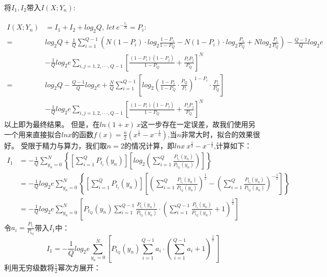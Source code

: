 \documentclass[12pt]{article}
\begin{document}
将$I_1,I_2$带入$I(X;Y_n)$:\par
\begin{equation*}
  \begin{aligned}
    I(X;Y_n) &= I_1+I_2+log_2Q,\ let\ e^{-\frac{t_i}{N}}=P_i :\\
    =& log_2Q+\frac{1}{Q}\sum\limits_{i=1}^{Q-1}\left(N(1-P_i)·log_2\frac{1-P_1}{1-P_Q}-N(1-P_i)·log_2\frac{P_1}{P_Q}+Nlog_2\frac{P_i}{P_Q}\right)-\frac{Q-1}{Q}log_2e \\
    &- \frac{1}{Q}log_2e\sum\limits_{i,j=1,2,···,Q-1}\left[\frac{(1-P_i)(1-P_j)}{1-P_Q}+\frac{P_iP_j}{P_Q}\right]^N \\
    =& log_2Q-\frac{Q-1}{Q}log_2e+\frac{N}{Q}\sum\limits_{i=1}^{Q-1}\left[log_2\left(\frac{1-P_i}{1-P_Q}·\frac{P_Q}{P_i}\right)^{1-P_i}·\frac{P_i}{P_Q}\right]\\
    &- \frac{1}{Q}log_2e\sum\limits_{i,j=1,2,···,Q-1}\left[\frac{(1-P_i)(1-P_j)}{1-P_Q}+\frac{P_iP_j}{P_Q}\right]^N
  \end{aligned}
\end{equation*}
以上即为最终结果。
但是，在$ln(1+x)~x$这一步存在一定误差，故我们使用另一个用来直接拟合$lnx$的函数$f(x)=\frac{n}{2}\left(x^{\frac{1}{n}}-x^{-\frac{1}{n}}\right)$,当$n$非常大时，拟合的效果很好。
受限于精力与算力，我们取$n=2$的情况计算，即$lnx~x^{\frac{1}{2}}-x^{-\frac{1}{2}}$,计算如下：
\begin{equation*}
  \begin{aligned}
    I_1 &= -\frac{1}{Q}\sum\limits_{y_n=0}^{N}\left\{\left[\sum\limits_{i=1}^QP_{t_i}(y_n)\right]\left[log_2\left(\sum\limits_{i=1}^Q\frac{P_{t_i}(y_n)}{P_{t_Q}(y_n)}\right)\right]\right\} \\
    &= -\frac{1}{Q}log_2e\sum\limits_{y_n=0}^{N}\left\{\left[\sum\limits_{i=1}^QP_{t_i}(y_n)\right]\left[\left(\sum\limits_{i=1}^Q\frac{P_{t_i}(y_n)}{P_{t_Q}(y_n)}\right)^{\frac{1}{2}}-\left(\sum\limits_{i=1}^Q\frac{P_{t_i}(y_n)}{P_{t_Q}(y_n)}\right)^{-\frac{1}{2}}\right]\right\} \\
    &= -\frac{1}{Q}log_2e\sum\limits_{y_n=0}^{N}\left[P_{t_Q}(y_n)\sum\limits_{i=1}^{Q-1}\frac{P_{t_i}(y_n)}{P_{t_Q}(y_n)}·\left(\sum\limits_{i=1}^{Q-1}\frac{P_{t_i}(y_n)}{P_{t_Q}(y_n)}+1\right)^{\frac{1}{2}}\right]
  \end{aligned}
\end{equation*}
令$a_i=\frac{P_{t_i}}{P_{t_Q}}$带入$I_1$中：
$$I_1=-\frac{1}{Q}log_2e\sum\limits_{y_n=0}^{N}\left[P_{t_Q}(y_n)\sum\limits_{i=1}^{Q-1}a_i·\left(\sum\limits_{i=1}^{Q-1}a_i+1\right)^{\frac{1}{2}}\right]$$
利用无穷级数将$\frac{1}{2}$幂次方展开：
\end{document}
